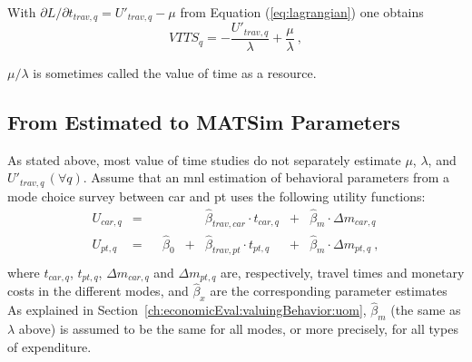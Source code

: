 With $\partial L / \partial t_{trav,q} = U'_{trav,q} - \mu$ from Equation (\ref{eq:lagrangian}) one obtains
\begin{equation}
VTTS_q 
= - \frac{U'_{trav,q}}{\lambda} + \frac{\mu}{\lambda} \ ,
\label{eq:vot2}
\end{equation}

$\mu/\lambda$ is sometimes called the value of time as a resource.




\subsection{From Estimated to MATSim Parameters}
\label{ch:economicEval:valuingBehavior:estimates2Matsim}

As stated above, most value of time studies do not separately estimate $\mu$, $\lambda$, and $U'_{trav,q} \, (\forall q)$. 
%
Assume that an \gls{mnl} estimation of behavioral parameters from a mode choice survey between car and \gls{pt} uses the following utility functions:
%
\begin{equation}
\begin{matrix}
U_{car,q} & =
&   &
&   & \hat{\beta}_{trav,car} \cdot t_{car,q}
& + & \hat{\beta}_{m} \cdot  \Delta{m_{car,q}} \\
%
U_{pt,q} & = 
&   & \hat{\beta}_{0}
& + & \hat{\beta}_{trav,pt} \cdot t_{pt,q}
& + & \hat{\beta}_{m} \cdot  \Delta{m_{pt,q}}  \ , \\
\end{matrix}
\label{eq:ch:economicEval:utilityTraveling}
\end{equation}
%
where $t_{car,q}$, $t_{pt,q}$, $\Delta{m_{car,q}}$ and $\Delta{m_{pt,q}}$  are, respectively, travel times and monetary costs in the different modes, and $\hat\beta_x$ are the corresponding parameter estimates
%
As explained in Section~\ref{ch:economicEval:valuingBehavior:uom}, $\hat\beta_m$ (the same as $\lambda$ above) is assumed to be the same for all modes, or more precisely, for all types of expenditure.


